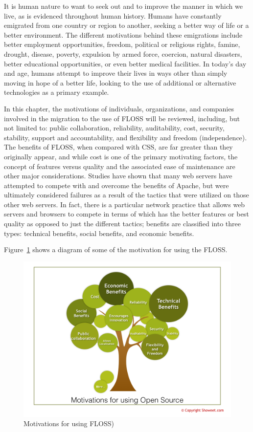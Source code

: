  It is human nature to want to seek out and to improve the manner in which we live, as is evidenced throughout human history. Humans have constantly emigrated from one country or region to another, seeking a better way of life or a better environment. The different motivations behind these emigrations include better employment opportunities, freedom, political or religious rights, famine, drought, disease, poverty, expulsion by armed force, coercion, natural disasters, better educational opportunities, or even better medical facilities.  In today’s day and age, humans attempt to improve their lives in ways other than simply moving in hope of a better life, looking to the use of additional or alternative technologies as a primary example.
 
\newpage

 In this chapter, the motivations of individuals, organizations, and companies involved in the migration to the use of FLOSS will be reviewed, including, but not limited to: public collaboration, reliability, auditability, cost, security, stability, support and accountability, and flexibility and freedom (independence). The benefits of FLOSS, when compared with CSS, are far greater than they originally appear, and while cost is one of the primary motivating factors, the concept of features versus quality and the associated ease of maintenance are other major considerations. Studies have shown that many web servers have attempted to compete with and overcome the benefits of Apache, but were ultimately considered failures as a result of the tactics that were utilized on those other web servers. In fact, there is a particular network practice that allows web servers and browsers to compete in terms of which has the better features or best quality as opposed to just the different tactics; benefits are classified into three types: technical benefits, social benefits, and economic benefits.

 Figure~\ref{fig:Motivations}  shows a diagram of some of the motivation for using the FLOSS.

  \begin{figure}
  \centering
      \includegraphics[scale=0.6,angle=90]{img/motivation.png}
    \caption{Motivations for using FLOSS)}
    \label{fig:Motivations}
  \end{figure}

